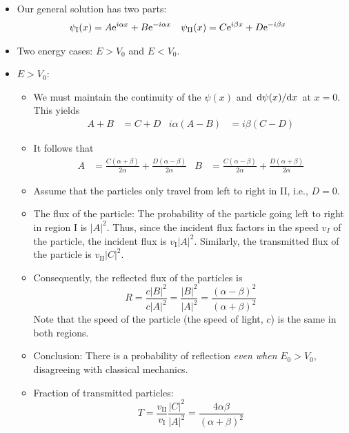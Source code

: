 \documentclass[../notes.tex]{subfiles}
\begin{document}
\begin{itemize}
\begin{itemize}
        \item Our general solution has two parts:
        \begin{align*}
            \psi_\text{I}(x)  &= A\e[i\alpha x]+B\e[-i\alpha x]&
            \psi_\text{II}(x) &= C\e[i\beta x]+D\e[-i\beta x]
        \end{align*}
        \item Two energy cases: $E>V_0$ and $E<V_0$.
        \item $E>V_0$:
        \begin{itemize}
            \item We must maintain the continuity of the $\psi(x)$ and $\dv*{\psi(x)}{x}$ at $x=0$. This yields
            \begin{align*}
                A+B &= C+D&
                i\alpha(A-B) &= i\beta(C-D)
            \end{align*}
            \item It follows that
            \begin{align*}
                A &= \frac{C(\alpha+\beta)}{2\alpha}+\frac{D(\alpha-\beta)}{2\alpha}&
                B &= \frac{C(\alpha-\beta)}{2\alpha}+\frac{D(\alpha+\beta)}{2\alpha}
            \end{align*}
            \item Assume that the particles only travel from left to right in II, i.e., $D=0$.
            \item The flux of the particle: The probability of the particle going left to right in region I is $|A|^2$. Thus, since the incident flux factors in the speed $v_I$ of the particle, the incident flux is $v_\text{I}|A|^2$. Similarly, the transmitted flux of the particle is $v_\text{II}|C|^2$.
            \item Consequently, the reflected flux of the particles is
            \begin{equation*}
                R = \frac{c|B|^2}{c|A|^2} = \frac{|B|^2}{|A|^2} = \frac{(\alpha-\beta)^2}{(\alpha+\beta)^2}
            \end{equation*}
            Note that the speed of the particle (the speed of light, $c$) is the same in both regions.
            \item Conclusion: There is a probability of reflection \emph{even when} $E_0>V_0$, disagreeing with classical mechanics.
            \item Fraction of transmitted particles:
            \begin{equation*}
                T = \frac{v_\text{II}}{v_\text{I}}\frac{|C|^2}{|A|^2} = \frac{4\alpha\beta}{(\alpha+\beta)^2}

\end{equation*}
\end{itemize}
\end{itemize}
\end{itemize}
\end{document}
